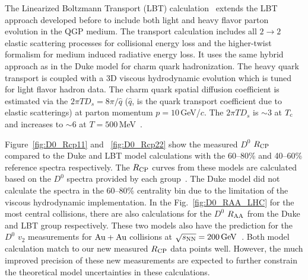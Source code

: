 \documentclass[%
 reprint,	
 amsmath,amssymb,
 aps,
 prc,
]{revtex4-1}
\begin{document}
The Linearized Boltzmann Transport (LBT) calculation~\cite{Cao:2016gvr} extends the LBT approach developed before to include both light and heavy flavor parton evolution in the QGP medium. The transport calculation includes all $2\rightarrow 2$ elastic scattering processes for collisional energy loss and the higher-twist formalism for medium induced radiative energy loss. It uses the same hybrid approach as in the Duke model for charm quark hadronization. The heavy quark transport is coupled with a 3D viscous hydrodynamic evolution which is tuned for light flavor hadron data. The charm quark spatial diffusion coefficient is estimated via the $2\pi TD_s =8\pi/\hat{q}$ ($\hat{q}$, is the quark transport coefficient due to elastic scatterings) at parton momentum $p = 10$\,GeV/$c$. The $2\pi TD_s$ is $\sim$3 at $T_{\rm c}$ and increases to $\sim$6 at $T = 500$\,MeV~\cite{LBT:private}.

Figure~\ref{fig:D0_Rcp11} and ~\ref{fig:D0_Rcp22} show the measured $D^0$ $R_{\rm CP}$ compared to the Duke and LBT model calculations with the 60--80\% and 40--60\% reference spectra respectively. The $R_{\rm CP}$ curves from these models are calculated based on the $D^0$ spectra provided by each group~\cite{Cao:2016gvr,LBT:private,Xu:2017obm}. The Duke model did not calculate the spectra in the 60--80\% centrality bin due to the limitation of the viscous hydrodynamic implementation. In the Fig.~\ref{fig:D0_RAA_LHC} for the most central collisions, there are also calculations for the $D^0$ $R_{\rm AA}$ from the Duke and LBT group respectively. These two models also have the prediction for the $D^0$ $v_2$ measurements for ${\rm{Au + Au}}$ collisions at ${\sqrt{s_{\rm NN}} = \rm{200\,GeV}}$~\cite{Star_D_v2}. %
Both model calculation match to our new measured $R_{\rm CP}$ data points well. However, the much improved precision of these new measurements are expected to further constrain the theoretical model uncertainties in these calculations.

\end{document}
